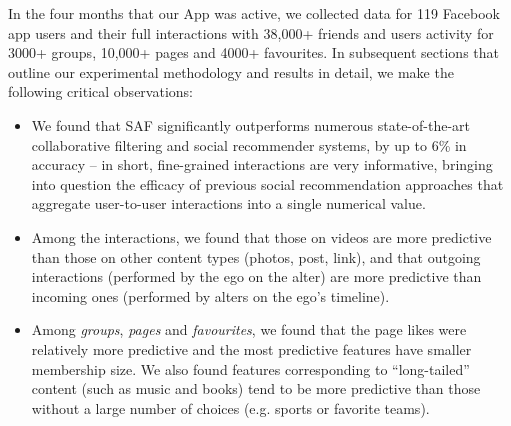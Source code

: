 In the four months that our App was active, we collected data for  
119 Facebook app users and their full interactions with 38,000+ friends
and users activity for 3000+ groups, 10,000+ pages and 4000+ favourites. 
In subsequent sections that outline our experimental methodology and results in detail, 
we make the following critical observations:
\begin{itemize}
\item We found that SAF significantly 
outperforms numerous state-of-the-art collaborative filtering and social recommender 
systems, by up to 6\% in accuracy -- in short, fine-grained 
interactions are very informative, bringing into question the efficacy of 
previous social recommendation approaches that aggregate user-to-user interactions into 
a single numerical value.


\item Among the interactions, we found that those on videos are more predictive than those on other content types (photos, post, link), and that outgoing interactions (performed by the ego on the alter) 
are more predictive than incoming ones (performed by alters on the ego's timeline).
\item %
Among {\em groups}, {\em pages} and {\em favourites}, we found that the page likes were
relatively more predictive and the most predictive features have smaller membership size. 
We also found features corresponding to ``long-tailed'' content (such as music and books)
tend to be more predictive than those without a large number of choices 
(e.g. sports or favorite teams). 
\end{itemize}

